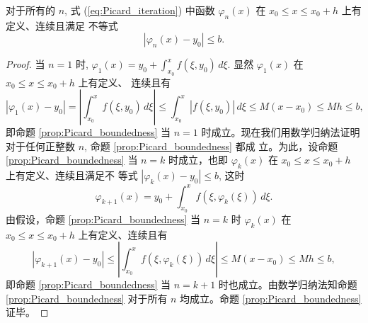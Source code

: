 \begin{proposition}[Picard逼近函数序列的良定义性]\label{prop:Picard_boundedness}
    对于所有的 $n$, 式 (\ref{eq:Picard_iteration}) 中函数 $\varphi_n(x)$ 在 $x_0 \le x \le x_0+h$ 上有定义、连续且满足
不等式
\begin{equation}
|\varphi_n(x)-y_0| \le b. \label{eq:Picard_bound_b}
\end{equation}
\end{proposition}
\begin{proof}
    当 $n=1$ 时, $\varphi_1(x)=y_0 + \int_{x_0}^{x} f(\xi,y_0)\,d\xi$. 显然 $\varphi_1(x)$ 在 $x_0 \le x \le x_0+h$ 上有定义、
连续且有
$$|\varphi_1(x) - y_0| = \left|\int_{x_0}^{x} f(\xi,y_0)\,d\xi\right| \le \int_{x_0}^{x} |f(\xi,y_0)|\,d\xi \le M(x-x_0) \le Mh \le b,$$
即命题 \ref{prop:Picard_boundedness} 当 $n=1$ 时成立。现在我们用数学归纳法证明对于任何正整数 $n$, 命题 \ref{prop:Picard_boundedness} 都成
立。为此，设命题 \ref{prop:Picard_boundedness} 当 $n=k$ 时成立，也即 $\varphi_k(x)$ 在 $x_0 \le x \le x_0+h$ 上有定义、连续且满足不
等式 $|\varphi_k(x)-y_0| \le b$, 这时
$$\varphi_{k+1}(x)=y_0 + \int_{x_0}^{x} f(\xi,\varphi_k(\xi))\,d\xi.$$
由假设，命题 \ref{prop:Picard_boundedness} 当 $n=k$ 时 $\varphi_k(x)$ 在 $x_0 \le x \le x_0+h$ 上有定义、连续且有
$$|\varphi_{k+1}(x)-y_0| \le \left|\int_{x_0}^{x} f(\xi,\varphi_k(\xi))\,d\xi\right| \le M(x-x_0) \le Mh \le b,$$
即命题 \ref{prop:Picard_boundedness} 当 $n=k+1$ 时也成立。由数学归纳法知命题 \ref{prop:Picard_boundedness} 对于所有 $n$ 均成立。命题 \ref{prop:Picard_boundedness} 证毕。
\end{proof}

